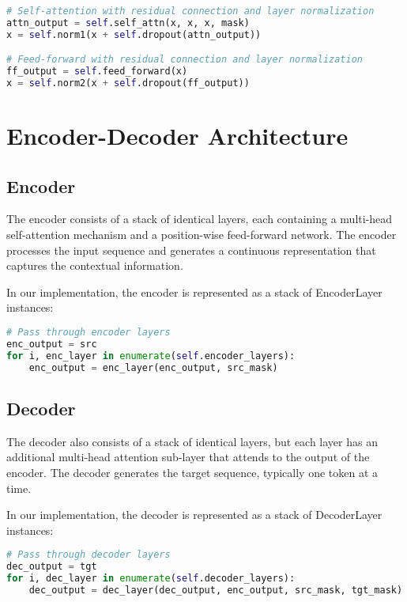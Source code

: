 \documentclass{article}
\begin{document}
\begin{lstlisting}[language=Python, caption=Residual Connections and Layer Normalization]
# Self-attention with residual connection and layer normalization
attn_output = self.self_attn(x, x, x, mask)
x = self.norm1(x + self.dropout(attn_output))

# Feed-forward with residual connection and layer normalization
ff_output = self.feed_forward(x)
x = self.norm2(x + self.dropout(ff_output))
\end{lstlisting}

\section{Encoder-Decoder Architecture}

\subsection{Encoder}

The encoder consists of a stack of identical layers, each containing a multi-head self-attention mechanism and a position-wise feed-forward network. The encoder processes the input sequence and generates a continuous representation that captures the contextual information.

In our implementation, the encoder is represented as a stack of EncoderLayer instances:

\begin{lstlisting}[language=Python, caption=Encoder Implementation]
# Pass through encoder layers
enc_output = src
for i, enc_layer in enumerate(self.encoder_layers):
    enc_output = enc_layer(enc_output, src_mask)
\end{lstlisting}

\subsection{Decoder}

The decoder also consists of a stack of identical layers, but each layer has an additional multi-head attention sub-layer that attends to the output of the encoder. The decoder generates the target sequence, typically one token at a time.

In our implementation, the decoder is represented as a stack of DecoderLayer instances:

\begin{lstlisting}[language=Python, caption=Decoder Implementation]
# Pass through decoder layers
dec_output = tgt
for i, dec_layer in enumerate(self.decoder_layers):
    dec_output = dec_layer(dec_output, enc_output, src_mask, tgt_mask)
\end{lstlisting}
\end{document}
